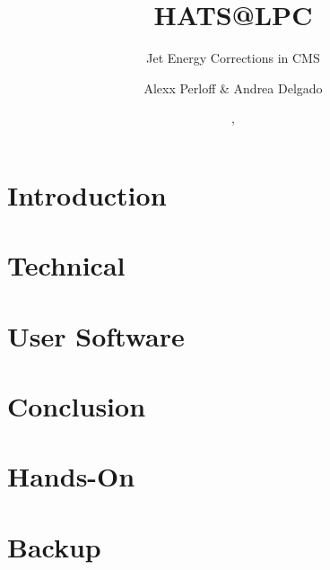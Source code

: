 \documentclass[compress,10pt,usenames,dvipsnames]{Presentation} %
\title[HATS\@LPC]{HATS@LPC} %
\subtitle[JEC]{Jet Energy Corrections in CMS} %
\author[A. Perloff]{Alexx Perloff\inst{1} \& Andrea Delgado\inst{1}} %
\institute[TAMU]
{
\begin{center}
  \inst{1}%
  Department of Physics and Astronomy\\
  Texas A{\&}M University\\
  \end{center}
}
\date{\dayofweekname{16}{06}{2015}, \displaydate{date}}
\begin{document}
\newlength{\residualSpace}


\section{Introduction}
\label{sec:introduction}


\section{Technical}
\label{sec:technical}


\section{User Software}
\label{sec:user_software}


\section{Conclusion}
\label{sec:conclusion}


\section{Hands-On}
\label{sec:hands_on}


\section*{Backup}
\label{sec:backup}

\end{document}
